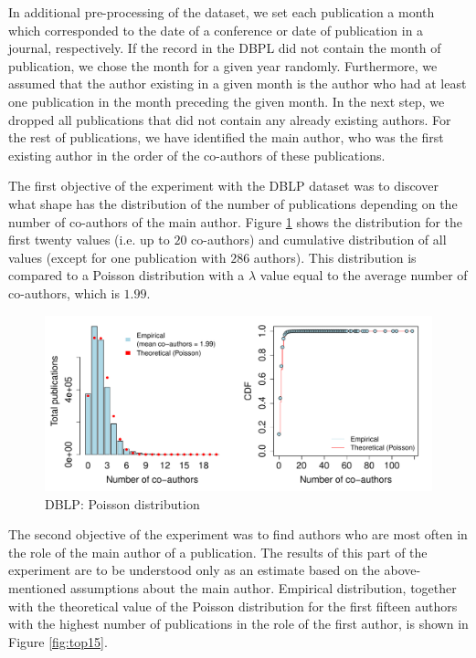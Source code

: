 In additional pre-processing of the dataset, we set each publication a month which corresponded to the date of a conference or date of publication in a journal, respectively.  If the record in the DBPL did not contain the month of publication, we chose the month for a given year randomly. Furthermore, we assumed that the author existing in a given month is the author who had at least one publication in the month preceding the given month. In the next step, we dropped all publications that did not contain any already existing authors. For the rest of publications, we have identified the main author, who was the first existing author in the order of the co-authors of these publications.


The first objective of the experiment with the DBLP dataset was to discover what shape has the distribution of the number of publications depending on the number of co-authors of the main author. Figure \ref{fig:poisfit} shows the distribution for the first twenty values (i.e. up to $20$ co-authors) and cumulative distribution of all values (except for one publication with $286$ authors). This distribution is compared to a Poisson distribution with a $\lambda$ value equal to the average number of co-authors, which is $1.99$.


\begin{figure}[ht]
\centering
\includegraphics[width=\linewidth]{figures/poisfit}
  \caption{DBLP: Poisson distribution}\label{fig:poisfit}
\end{figure}

The second objective of the experiment was to find authors who are most often in the role of the main author of a publication. The results of this part of the experiment are to be understood only as an estimate based on the above-mentioned assumptions about the main author. Empirical distribution, together with the theoretical value of the Poisson distribution for the first fifteen authors with the highest number of publications in the role of the first author, is shown in Figure \ref{fig:top15}.


